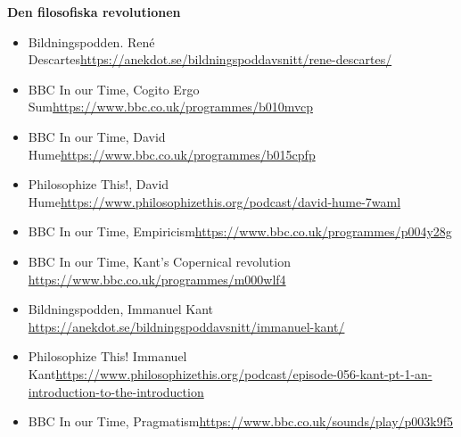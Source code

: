 \documentclass[11pt,a4paper]{report}
\begin{document}
\textbf{Den filosofiska revolutionen}

\begin{itemize}
\item Bildningspodden. René Descartes\newline \href{https://anekdot.se/bildningspoddavsnitt/rene-descartes/}{https://anekdot.se/bildningspoddavsnitt/rene-descartes/}

\item BBC In our Time, Cogito Ergo Sum\newline \href{https://www.bbc.co.uk/programmes/b010mvcp}{https://www.bbc.co.uk/programmes/b010mvcp}

\item BBC In our Time, David Hume\newline \href{https://www.bbc.co.uk/programmes/b015cpfp}{https://www.bbc.co.uk/programmes/b015cpfp}

\item Philosophize This!, David Hume\newline \href{https://www.philosophizethis.org/podcast/david-hume-7waml}{https://www.philosophizethis.org/podcast/david-hume-7waml}

\item BBC In our Time, Empiricism\newline \href{https://www.bbc.co.uk/programmes/p004y28g}{https://www.bbc.co.uk/programmes/p004y28g}

\item BBC In our Time, Kant's Copernical revolution \newline \href{https://www.bbc.co.uk/programmes/m000wlf4}{https://www.bbc.co.uk/programmes/m000wlf4}

\item Bildningspodden, Immanuel Kant \newline \href{https://anekdot.se/bildningspoddavsnitt/immanuel-kant/}{https://anekdot.se/bildningspoddavsnitt/immanuel-kant/}

\item Philosophize This! Immanuel Kant\newline \href{https://www.philosophizethis.org/podcast/episode-056-kant-pt-1-an-introduction-to-the-introduction}{https://www.philosophizethis.org/podcast/episode-056-kant-pt-1-an-introduction-to-the-introduction}

\item BBC In our Time, Pragmatism\newline \href{https://www.bbc.co.uk/sounds/play/p003k9f5}{https://www.bbc.co.uk/sounds/play/p003k9f5}


\end{itemize}
\end{document}
